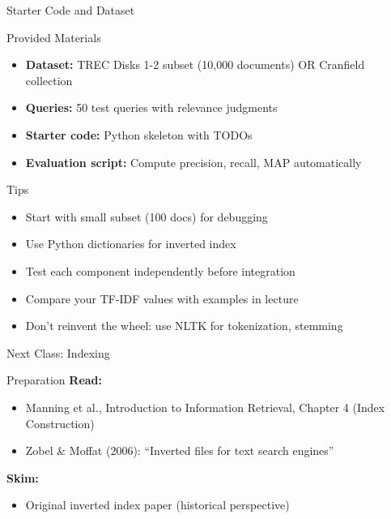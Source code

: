 \documentclass[aspectratio=169]{beamer}
\newif\ifanimated
\newcommand{\cpause}{\ifanimated\pause\fi}
\begin{document}
\begin{frame}[shrink=5]{Starter Code and Dataset}
\begin{block}{Provided Materials}
\begin{itemize}
    \item \textbf{Dataset:} TREC Disks 1-2 subset (10,000 documents) OR Cranfield collection
    \item \textbf{Queries:} 50 test queries with relevance judgments
    \item \textbf{Starter code:} Python skeleton with TODOs
    \item \textbf{Evaluation script:} Compute precision, recall, MAP automatically
\end{itemize}
\cpause
\end{block}
\cpause
\vspace{1em}

\begin{alertblock}{Tips}
\begin{itemize}
    \item Start with small subset (100 docs) for debugging
    \item Use Python dictionaries for inverted index
    \item Test each component independently before integration
    \item Compare your TF-IDF values with examples in lecture
    \item Don't reinvent the wheel: use NLTK for tokenization, stemming
\end{itemize}
\end{alertblock}
\end{frame}

\begin{frame}[shrink=10]{Next Class: Indexing}
\begin{block}{Preparation}
\textbf{Read:}
\begin{itemize}
    \item Manning et al., Introduction to Information Retrieval, Chapter 4 (Index Construction)
    \item Zobel \& Moffat (2006): ``Inverted files for text search engines''
\end{itemize}
\cpause
\vspace{0.5em}

\textbf{Skim:}
\begin{itemize}
    \item Original inverted index paper (historical perspective)
\end{itemize}
\cpause
\end{block}
\cpause
\vspace{1em}
\end{frame}
\end{document}
